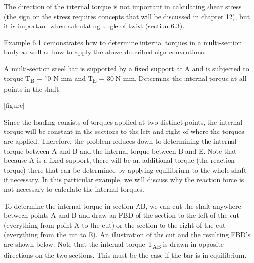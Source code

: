 \documentclass[
  letterpaper,
  DIV=11,
  numbers=noendperiod]{scrreprt}
\begin{document}
The direction of the internal torque is not important in calculating
shear stress (the sign on the stress requires concepts that will be
discussed in chapter 12), but it is important when calculating angle of
twist (section 6.3).

Example 6.1 demonstrates how to determine internal torques in a
multi-section body as well as how to apply the above-described sign
conventions.

\begin{tcolorbox}[enhanced jigsaw, breakable, opacityback=0, toptitle=1mm, left=2mm, colback=white, opacitybacktitle=0.6, colframe=quarto-callout-tip-color-frame, titlerule=0mm, arc=.35mm, leftrule=.75mm, bottomtitle=1mm, colbacktitle=quarto-callout-tip-color!10!white, rightrule=.15mm, title={Example 6.1}, bottomrule=.15mm, toprule=.15mm, coltitle=black]

A multi-section steel bar is supported by a fixed support at A and is
subjected to torque T\textsubscript{B} = 70 N mm and T\textsubscript{E}
= 30 N mm. Determine the internal torque at all points in the shaft.

{[}figure{]}

\begin{tcolorbox}[enhanced jigsaw, breakable, opacityback=0, toptitle=1mm, left=2mm, colback=white, opacitybacktitle=0.6, colframe=quarto-callout-tip-color-frame, titlerule=0mm, arc=.35mm, leftrule=.75mm, bottomtitle=1mm, colbacktitle=quarto-callout-tip-color!10!white, rightrule=.15mm, title={Solution}, bottomrule=.15mm, toprule=.15mm, coltitle=black]

Since the loading consists of torques applied at two distinct points,
the internal torque will be constant in the sections to the left and
right of where the torques are applied. Therefore, the problem reduces
down to determining the internal torque between A and B and the internal
torque between B and E. Note that because A is a fixed support, there
will be an additional torque (the reaction torque) there that can be
determined by applying equilibrium to the whole shaft if necessary. In
this particular example, we will discuss why the reaction force is not
necessary to calculate the internal torques.~

To determine the internal torque in section AB, we can cut the shaft
anywhere between points A and B and draw an FBD of the section to the
left of the cut (everything from point A to the cut) or the section to
the right of the cut (everything from the cut to E). An illustration of
the cut and the resulting FBD's are shown below. Note that the internal
torque T\textsubscript{AB} is drawn in opposite directions on the two
sections. This must be the case if the bar is in equilibrium.


\end{tcolorbox}
\end{tcolorbox}
\end{document}
